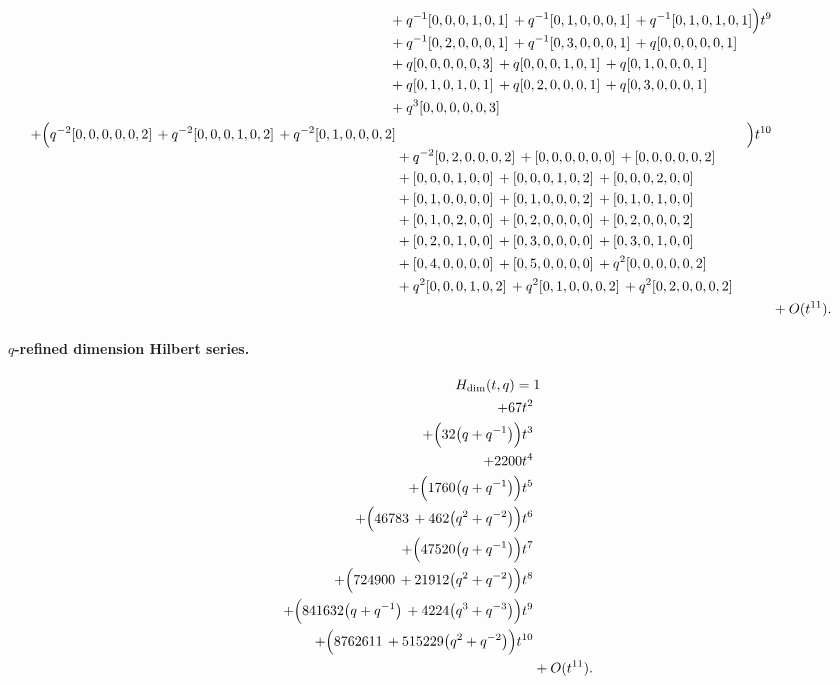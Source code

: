 \documentclass[10pt]{article}
\begin{document}
\[\begin{aligned}
\begin{aligned}[t]
  &{}+q^{-1}[0,0,0,1,0,1]\,+q^{-1}[0,1,0,0,0,1]\,+q^{-1}[0,1,0,1,0,1] \\
  &{}+q^{-1}[0,2,0,0,0,1]\,+q^{-1}[0,3,0,0,0,1]\,+q[0,0,0,0,0,1] \\
  &{}+q[0,0,0,0,0,3]\,+q[0,0,0,1,0,1]\,+q[0,1,0,0,0,1] \\
  &{}+q[0,1,0,1,0,1]\,+q[0,2,0,0,0,1]\,+q[0,3,0,0,0,1] \\
  &{}+q^{3}[0,0,0,0,0,3]\end{aligned}\Bigr)t^{9} \\
  + \Bigl(\begin{aligned}[t]q^{-2}[0,0,0,0,0,2]\,+q^{-2}[0,0,0,1,0,2]\,+q^{-2}[0,1,0,0,0,2] \\
  &{}+q^{-2}[0,2,0,0,0,2]\,+[0,0,0,0,0,0]\,+[0,0,0,0,0,2] \\
  &{}+[0,0,0,1,0,0]\,+[0,0,0,1,0,2]\,+[0,0,0,2,0,0] \\
  &{}+[0,1,0,0,0,0]\,+[0,1,0,0,0,2]\,+[0,1,0,1,0,0] \\
  &{}+[0,1,0,2,0,0]\,+[0,2,0,0,0,0]\,+[0,2,0,0,0,2] \\
  &{}+[0,2,0,1,0,0]\,+[0,3,0,0,0,0]\,+[0,3,0,1,0,0] \\
  &{}+[0,4,0,0,0,0]\,+[0,5,0,0,0,0]\,+q^{2}[0,0,0,0,0,2] \\
  &{}+q^{2}[0,0,0,1,0,2]\,+q^{2}[0,1,0,0,0,2]\,+q^{2}[0,2,0,0,0,2]\end{aligned}\Bigr)t^{10} \\
  &+ O(t^{11}).
\end{aligned}
\]
\paragraph{$q$-refined dimension Hilbert series.}
\[
\begin{aligned}
H_{\mathrm{dim}}(t,q) ={}&
   1 \\
  + 67t^{2} \\
  + \Bigl(32\bigl(q+q^{-1}\bigr)\Bigr)t^{3} \\
  + 2200t^{4} \\
  + \Bigl(1760\bigl(q+q^{-1}\bigr)\Bigr)t^{5} \\
  + \Bigl(46783\,+462\bigl(q^{2}+q^{-2}\bigr)\Bigr)t^{6} \\
  + \Bigl(47520\bigl(q+q^{-1}\bigr)\Bigr)t^{7} \\
  + \Bigl(724900\,+21912\bigl(q^{2}+q^{-2}\bigr)\Bigr)t^{8} \\
  + \Bigl(841632\bigl(q+q^{-1}\bigr)\,+4224\bigl(q^{3}+q^{-3}\bigr)\Bigr)t^{9} \\
  + \Bigl(8762611\,+515229\bigl(q^{2}+q^{-2}\bigr)\Bigr)t^{10} \\
  &+ O(t^{11}).
\end{aligned}
\]
\end{document}
